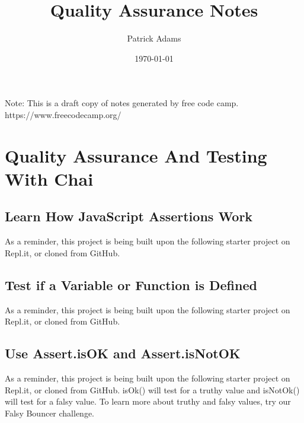 \documentclass{article}%
\title{Quality Assurance Notes}%
\author{Patrick Adams}%
\date{\today}%
\begin{document}
%
\normalsize%
\maketitle%
\newpage%
Note: This is a draft copy of notes generated by free code camp.\newline%
%
https://www.freecodecamp.org/%
\newpage%
\tableofcontents%
\section{Quality Assurance And Testing With Chai}%
\label{sec:QualityAssuranceAndTestingWithChai}%
\subsection{Learn How JavaScript Assertions Work}%
\label{subsec:LearnHowJavaScriptAssertionsWork}%
As a reminder, this project is being built upon the following starter project on Repl.it, or cloned from GitHub.\newline%

%
\subsection{Test if a Variable or Function is Defined}%
\label{subsec:TestifaVariableorFunctionisDefined}%
As a reminder, this project is being built upon the following starter project on Repl.it, or cloned from GitHub.\newline%

%
\subsection{Use Assert.isOK and Assert.isNotOK}%
\label{subsec:UseAssert.isOKandAssert.isNotOK}%
As a reminder, this project is being built upon the following starter project on Repl.it, or cloned from GitHub.\newline%
isOk() will test for a truthy value and isNotOk() will test for a falsy value.\newline%
To learn more about truthy and falsy values, try our Falsy Bouncer challenge.\newline%

%
\end{document}
